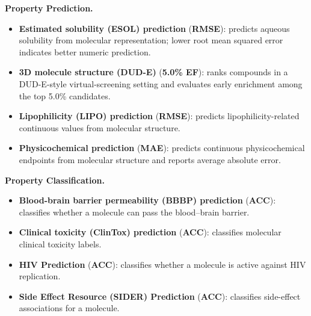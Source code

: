 \begin{appendices}
\textbf{Property Prediction.}
\begin{itemize}
    \item \textbf{Estimated solubility (ESOL) prediction} (\textbf{RMSE}): predicts aqueous solubility from molecular representation; lower root mean squared error indicates better numeric prediction.
    \item \textbf{3D molecule structure (DUD-E)} (\textbf{5.0\% EF}): ranks compounds in a DUD-E-style virtual-screening setting and evaluates early enrichment among the top 5.0\% candidates.
    \item \textbf{Lipophilicity (LIPO) prediction} (\textbf{RMSE}): predicts lipophilicity-related continuous values from molecular structure.
    \item \textbf{Physicochemical prediction} (\textbf{MAE}): predicts continuous physicochemical endpoints from molecular structure and reports average absolute error.
\end{itemize}

\textbf{Property Classification.}
\begin{itemize}
    \item \textbf{Blood-brain barrier permeability (BBBP) prediction} (\textbf{ACC}): classifies whether a molecule can pass the blood--brain barrier.
    \item \textbf{Clinical toxicity (ClinTox) prediction} (\textbf{ACC}): classifies molecular clinical toxicity labels.
    \item \textbf{HIV Prediction} (\textbf{ACC}): classifies whether a molecule is active against HIV replication.
    \item \textbf{Side Effect Resource (SIDER) Prediction} (\textbf{ACC}): classifies side-effect associations for a molecule.
\end{itemize}


\end{appendices}
